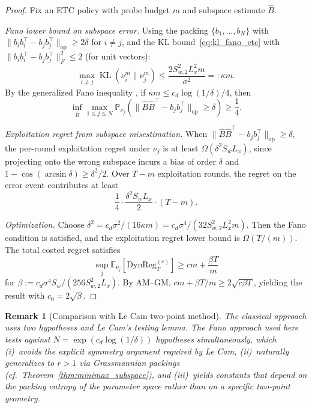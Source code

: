 \documentclass[12pt]{article}
\newcommand{\E}{\mathbb{E}}
\newcommand{\Prob}{\mathbb{P}}
\newcommand{\op}{\mathrm{op}}
\newcommand{\DynReg}{\mathrm{DynReg}}
\DeclareMathOperator{\KL}{KL}
\newtheorem{remark}{Remark}
\theoremstyle{plain}
\theoremstyle{definition}
\begin{document}
\begin{proof}
Fix an ETC policy with probe budget $m$ and subspace estimate $\hat{B}$.

\emph{Fano lower bound on subspace error.}
Using the packing $\{b_1, \ldots, b_N\}$ with $\|b_i b_i^\top - b_j b_j^\top\|_{\op} \ge 2\delta$ for $i \neq j$, and the KL bound~\eqref{eq:kl_fano_etc} with $\|b_i b_i^\top - b_j b_j^\top\|_F^2 \le 2$ (for unit vectors):
\[
\max_{i \neq j} \KL(\nu_i^m \| \nu_j^m) \le \frac{2S_{w,2}^2 L_x^2 m}{\sigma^2} =: \kappa m.
\]
By the generalized Fano inequality \citep[Theorem~2.7]{tsybakov2009introduction}, if $\kappa m \le c_d \log(1/\delta) / 4$, then
\[
\inf_{\hat{B}} \max_{1 \le j \le N} \Prob_{\nu_j}(\|\hat{B}\hat{B}^\top - b_j b_j^\top\|_{\op} \ge \delta) \ge \frac{1}{4}.
\]

\emph{Exploitation regret from subspace misestimation.}
When $\|\hat{B}\hat{B}^\top - b_j b_j^\top\|_{\op} \ge \delta$, the per-round exploitation regret under $\nu_j$ is at least $\Omega(\delta^2 S_w L_x)$, since projecting onto the wrong subspace incurs a bias of order $\delta$ and $1 - \cos(\arcsin\delta) \ge \delta^2/2$. Over $T - m$ exploitation rounds, the regret on the error event contributes at least
\[
\frac{1}{4} \cdot \frac{\delta^2 S_w L_x}{2} \cdot (T - m).
\]

\emph{Optimization.}
Choose $\delta^2 = c_d \sigma^2 / (16\kappa m) = c_d \sigma^4 / (32 S_{w,2}^2 L_x^2 m)$. Then the Fano condition is satisfied, and the exploitation regret lower bound is $\Omega(T/(m))$. The total costed regret satisfies
\[
\sup_j \E_{\nu_j}[\DynReg_T^{(c)}] \ge cm + \frac{\beta T}{m}
\]
for $\beta := c_d \sigma^4 S_w / (256 S_{w,2}^2 L_x)$. By AM--GM, $cm + \beta T / m \ge 2\sqrt{c\beta T}$, yielding the result with $c_0 = 2\sqrt{\beta}$.
\end{proof}

\begin{remark}[Comparison with Le Cam two-point method]
\label{rem:fano_vs_lecam}
The classical approach uses two hypotheses and Le Cam's testing lemma. The Fano approach used here tests against $N = \exp(c_d \log(1/\delta))$ hypotheses simultaneously, which (i)~avoids the explicit symmetry argument required by Le Cam, (ii)~naturally generalizes to $r > 1$ via Grassmannian packings (cf.\ Theorem~\ref{thm:minimax_subspace}), and (iii)~yields constants that depend on the packing entropy of the parameter space rather than on a specific two-point geometry.
\end{remark}
\end{document}
